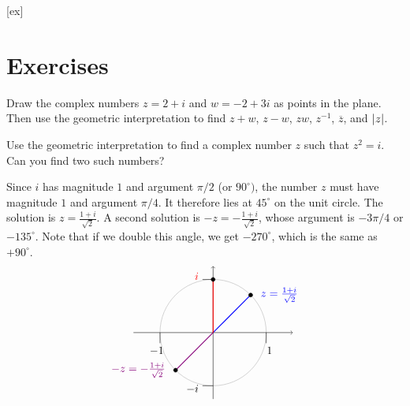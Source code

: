 [ex]
\section*{Exercises}


\begin{ex}
  Draw the complex numbers $z = 2+i$ and $w = -2+3i$ as points in the
  plane. Then use the geometric interpretation to find $z+w$,
  $z-w$, $zw$, $z^{-1}$, $\overline{z}$, and $\left|z\right|$. 
\end{ex}

\begin{ex}
  Use the geometric interpretation to find a complex number $z$ such
  that $z^2 = i$. Can you find two such numbers?
  \begin{sol}
    Since $i$ has magnitude $1$ and argument $\pi/2$ (or
    $90^{\circ})$, the number $z$ must have magnitude $1$ and argument
    $\pi/4$. It therefore lies at $45^{\circ}$ on the unit circle. The
    solution is $z=\frac{1+i}{\sqrt{2}}$. A second solution is
    $-z=-\frac{1+i}{\sqrt{2}}$, whose argument is $-3\pi/4$ or
    $-135^{\circ}$. Note that if we double this angle, we get
    $-270^{\circ}$, which is the same as $+90^{\circ}$.
    \begin{equation*}
      \begin{tikzpicture}[scale=1.7]
        \draw[black!30] (0,0) circle (1);
        \draw[->](-1.5,0) -- (1.5,0);
        \draw[->](0,-1.25) -- (0,1.25);
        \draw(0,-1) -- +(-0.2,0) node[left,yshift=-3pt] {$-i$};
        \draw(0,1) -- +(-0.2,0) node[left,yshift=3pt,red] {$i$};
        \draw(-1,0) -- +(0,-0.2) node[below,xshift=-3pt] {$-1$};
        \draw(1,0) -- +(0,-0.2) node[below,xshift=3pt] {$1$};
        \draw[thick, blue] (0,0) -- (45:1);
        \draw[thick, purple!70!blue] (0,0) -- (225:1);
        \draw[thick, red] (0,0) -- (90:1);
        \draw[fill, black] (45:1) circle [radius=1.06pt] node [right=2mm, blue] {$z = \frac{1+i}{\sqrt{2}}$};
        \draw[fill, black] (225:1) circle [radius=1.06pt] node [left=2mm, purple!70!blue] {$-z = -\frac{1+i}{\sqrt{2}}$};
        \draw[fill, black] (90:1) circle [radius=1.06pt];
      \end{tikzpicture}
    \end{equation*}
  \end{sol}
\end{ex}

